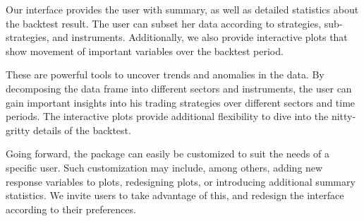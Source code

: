 \documentclass[article]{jss}
\begin{document}
\noindent
Our interface provides the user with summary, as well as detailed statistics about the backtest result. The user can subset her data according to strategies, sub-strategies, and instruments. Additionally, we also provide interactive plots that show movement of important variables over the backtest period. 


\noindent
These are powerful tools to uncover trends and anomalies in the data. By decomposing the data frame into different sectors and instruments, the user can gain important insights into his trading strategies over different sectors and time periods. The interactive plots provide additional flexibility to dive into the nitty-gritty details of the backtest.

\noindent
Going forward, the  package can easily be customized to suit the needs of a specific user. Such customization may include, among others, adding new response variables to plots, redesigning plots, or introducing additional summary statistics. We invite users to take advantage of this, and redesign the  interface according to their preferences. 










\end{document}
